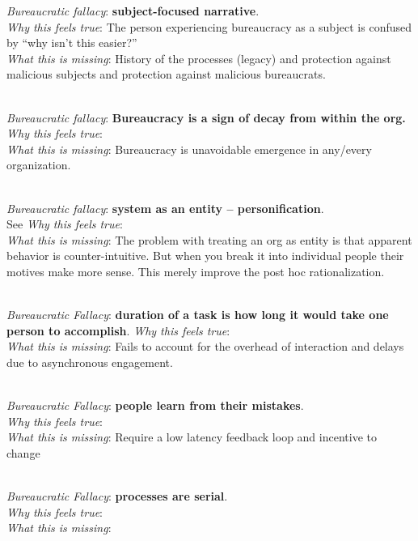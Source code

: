 \textit{Bureaucratic fallacy}: \textbf{subject-focused narrative}. \\
\textit{Why this feels true}: The person experiencing bureaucracy as a subject is confused by ``why isn't this easier?''  \\
\textit{What this is missing}: History of the processes (legacy) and protection against malicious subjects and protection against malicious bureaucrats. 

\ \\

\textit{Bureaucratic fallacy}: \textbf{Bureaucracy is a sign of decay from within the org.}
\textit{Why this feels true}: \\
\textit{What this is missing}: Bureaucracy is unavoidable emergence in any/every organization.

\ \\

\textit{Bureaucratic fallacy}: \textbf{system as an entity -- personification}. \\
See \cite{2002_Gall}
\textit{Why this feels true}: \\
\textit{What this is missing}: The problem with treating an org as entity is that apparent behavior is counter-intuitive. But when you break it into individual people their motives make more sense. This merely improve the post hoc rationalization. 

\ \\

\textit{Bureaucratic Fallacy}: \textbf{duration of a task is how long it would take one person to accomplish}. 
\textit{Why this feels true}: \\
\textit{What this is missing}: Fails to account for the overhead of interaction and delays due to asynchronous engagement.

\ \\

\textit{Bureaucratic Fallacy}: \textbf{people learn from their mistakes}. \\
\textit{Why this feels true}: \\
\textit{What this is missing}: Require a low latency feedback loop and incentive to change

\ \\

\textit{Bureaucratic Fallacy}: \textbf{processes are serial}.\\
\textit{Why this feels true}: \\
\textit{What this is missing}: 



